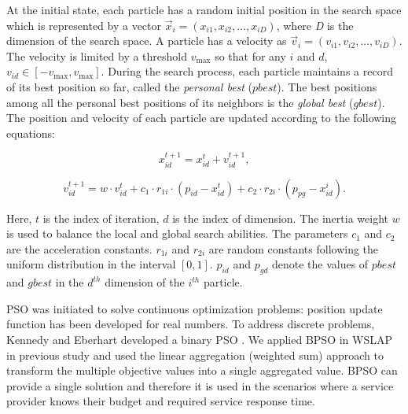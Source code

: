 \documentclass[10pt,journal,compsoc]{IEEEtran}
\begin{document}
At the initial state, each particle has a random initial position in the search space which is represented by a vector $\vec{x}_i = (x_{i1}, x_{i2}, \dots, x_{iD})$, where \emph{D} is the dimension of the search space. A particle has a velocity as $\vec{v}_i = (v_{i1}, v_{i2}, \dots, v_{iD})$. The velocity is limited by a threshold $v_{\max}$ so that for any $i$ and $d$, $v_{id} \in [-v_{\max}, v_{\max}]$. During the search process, each particle maintains a record of its best position so far, called the \emph{personal best} ($pbest$). The best positions among all the personal best positions of its neighbors is the \emph{global best} ($gbest$). The position and velocity of each particle are updated according to the following equations:
\vspace{-1 mm}
\begin{small}
\begin{equation}
\label{eq:updatePosition}
 x^{t+1}_{id} = x^{t}_{id} + v^{t+1}_{id},
\end{equation}
\vspace{-10 mm}

\begin{equation}
\label{eq:updateVelocity}
 v^{t+1}_{id} = w \cdot v^{t}_{id} + c_1 \cdot r_{1i} \cdot (p_{id} - x^t_{id}) + c_2 \cdot r_{2i} \cdot (p_{pg} - x^i_{id}).
\end{equation}
\end{small}

Here, $t$ is the index of iteration, $d$ is the index of dimension. The inertia weight $w$ is used to balance the local and global search abilities. The parameters $c_1$ and $c_2$ are the acceleration constants. $r_{1i}$ and $r_{2i}$ are random constants following the uniform distribution in the interval $[0, 1]$. $p_{id}$ and $p_{gd}$ denote the values of $pbest$ and $gbest$ in the $d^{th}$ dimension of the $i^{th}$ particle.

PSO was initiated to solve continuous optimization problems: position update function has been developed for real numbers. 
To address discrete problems, Kennedy and Eberhart developed a binary PSO \cite{Kennedy:1997hd}. We applied BPSO in WSLAP in previous study \cite{Tan2016a} and used the linear aggregation (weighted sum) approach to transform the multiple objective values into a single aggregated value.
BPSO can provide a single solution and therefore it is used in the scenarios where a service provider knows their budget and required service response time. 
\end{document}
